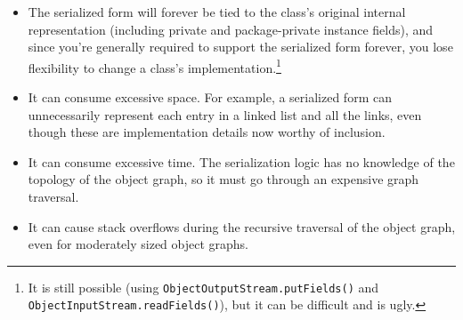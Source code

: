 \documentclass[table, xcdraw]{article}%
\begin{document}
\begin{itemize}
    \item The serialized form will forever be tied to the class’s original internal representation (including private and package-private instance fields), and since you're generally required to support the serialized form forever, you lose flexibility to change a class’s implementation.\footnote{It is still possible (using \texttt{ObjectOutputStream.putFields()} and \texttt{ObjectInputStream.readFields()}), but it can be difficult and is ugly.}
    \item It can consume excessive space. For example, a serialized form can unnecessarily represent each entry in a linked list and all the links, even though these are implementation details now worthy of inclusion.
    \item It can consume excessive time. The serialization logic has no knowledge of the topology of the object graph, so it must go through an expensive graph traversal.
    \item It can cause stack overflows during the recursive traversal of the object graph, even for moderately sized object graphs.
\end{itemize}
\end{document}
